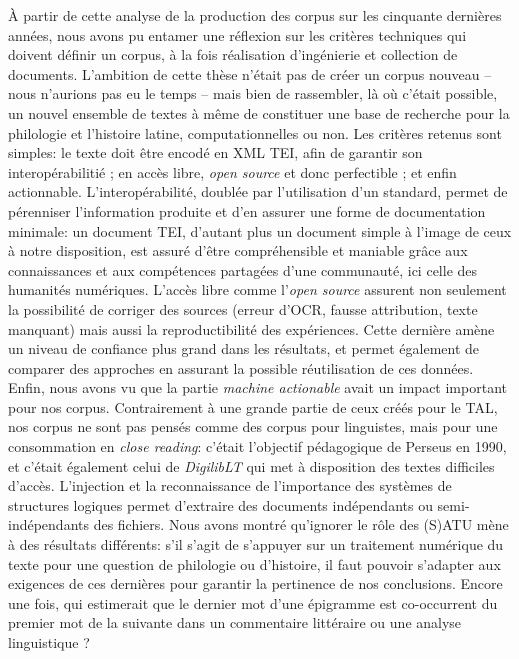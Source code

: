 À partir de cette analyse de la production des corpus sur les cinquante dernières années, nous avons pu entamer une réflexion sur les critères techniques qui doivent définir un corpus, à la fois réalisation d'ingénierie et collection de documents. L'ambition de cette thèse n'était pas de créer un corpus nouveau -- nous n'aurions pas eu le temps -- mais bien de rassembler, là où c'était possible, un nouvel ensemble de textes à même de constituer une base de recherche pour la philologie et l'histoire latine, computationnelles ou non. Les critères retenus sont simples: le texte doit être encodé en XML TEI, afin de garantir son interopérabilitié ; en accès libre, \textit{open source} et donc perfectible ; et enfin actionnable. L'interopérabilité, doublée par l'utilisation d'un standard, permet de pérenniser l'information produite et d'en assurer une forme de documentation minimale: un document TEI, d'autant plus un document simple à l'image de ceux à notre disposition, est assuré d'être compréhensible et maniable grâce aux connaissances et aux compétences partagées d'une communauté, ici celle des humanités numériques. L'accès libre comme l'\textit{open source} assurent non seulement la possibilité de corriger des sources (erreur d'OCR, fausse attribution, texte manquant) mais aussi la reproductibilité des expériences. Cette dernière amène un niveau de confiance plus grand dans les résultats, et permet également de comparer des approches en assurant la possible réutilisation de ces données. Enfin, nous avons vu que la partie \textit{machine actionable} avait un impact important pour nos corpus. Contrairement à une grande partie de ceux créés pour le TAL, nos corpus ne sont pas pensés comme des corpus pour linguistes, mais pour une consommation en \textit{close reading}: c'était l'objectif pédagogique de Perseus en 1990, et c'était également celui de \textit{DigilibLT} qui met à disposition des textes difficiles d'accès. L'injection et la reconnaissance de l'importance des systèmes de structures logiques permet d'extraire des documents indépendants ou semi-indépendants des fichiers. Nous avons montré qu'ignorer le rôle des (S)ATU mène à des résultats différents: s'il s'agit de s'appuyer sur un traitement numérique du texte pour une question de philologie ou d'histoire, il faut pouvoir s'adapter aux exigences de ces dernières pour garantir la pertinence de nos conclusions. Encore une fois, qui estimerait que le dernier mot d'une épigramme est co-occurrent du premier mot de la suivante dans un commentaire littéraire ou une analyse linguistique ?


